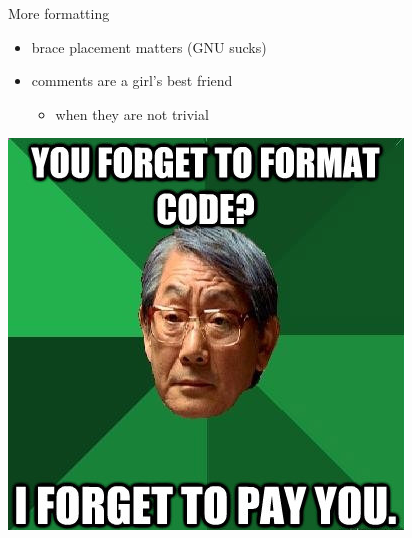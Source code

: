 \documentclass{beamer}
\begin{document}
\begin{frame}{More formatting}
  \begin{itemize}
    \pause
    \item brace placement matters \pause (GNU sucks)
    \pause
    \item comments are a girl's best friend
    \pause
    \begin{itemize}
      \item when they are not trivial
    \end{itemize}
    \pause
  \end{itemize}
  \begin{center}
    \includegraphics[scale=0.4]{img/asian}
  \end{center}
\end{frame}
\end{document}
